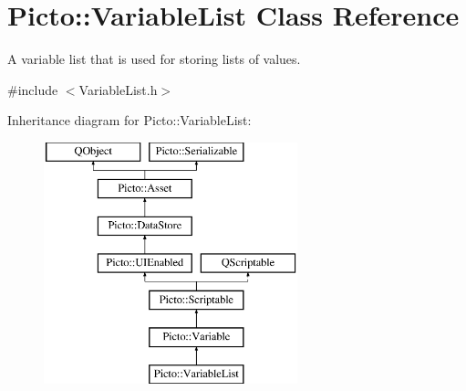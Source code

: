 \hypertarget{class_picto_1_1_variable_list}{\section{Picto\-:\-:Variable\-List Class Reference}
\label{class_picto_1_1_variable_list}
}


A variable list that is used for storing lists of values.  




{\ttfamily \#include $<$Variable\-List.\-h$>$}

Inheritance diagram for Picto\-:\-:Variable\-List\-:\begin{figure}[H]
\begin{center}
\leavevmode
\includegraphics[height=7.000000cm]{class_picto_1_1_variable_list}
\end{center}
\end{figure}
